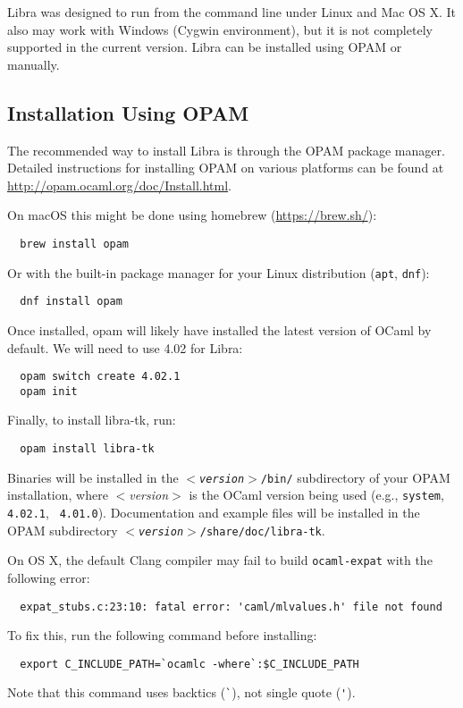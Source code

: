 \documentclass[11pt]{article}
\begin{document}
Libra was designed to run from the command line under Linux and Mac OS
X. It also may work with Windows (Cygwin environment), but it is not
completely supported in the current version.  Libra can be installed
using OPAM or manually.

\subsection{Installation Using OPAM}

The recommended way to install Libra is through the OPAM package
manager.  Detailed instructions for installing OPAM on various
platforms can be found at \url{http://opam.ocaml.org/doc/Install.html}.

On macOS this might be done using homebrew (\url{https://brew.sh/}):
\begin{verbatim}
  brew install opam
\end{verbatim}

Or with the built-in package manager for your Linux distribution ({\tt apt}, {\tt dnf}):
\begin{verbatim}
  dnf install opam
\end{verbatim}

Once installed, opam will likely have installed the latest version of OCaml
by default.  We will need to use 4.02 for Libra:
\begin{verbatim}
  opam switch create 4.02.1
  opam init
\end{verbatim}

Finally, to install libra-tk, run:
\begin{verbatim}
  opam install libra-tk
\end{verbatim}

Binaries will be installed in the {\tt {\em $<$version$>$}/bin/}
subdirectory of your OPAM installation, where {\em $<$version$>$} is
the OCaml version being used (e.g., {\tt system}, {\tt 4.02.1}, {\tt
4.01.0}).  Documentation and example files will be installed in the OPAM subdirectory
{\tt {\em $<$version$>$}/share/doc/libra-tk}.

On OS X, the default Clang compiler may fail to build
{\tt ocaml-expat} with the following error:
\begin{verbatim}
  expat_stubs.c:23:10: fatal error: 'caml/mlvalues.h' file not found
\end{verbatim}
To fix this, run the following command before installing:
\begin{verbatim}
  export C_INCLUDE_PATH=`ocamlc -where`:$C_INCLUDE_PATH
\end{verbatim}
Note that this command uses backtics (\verb|`|), not
single quote (\verb|'|).
\end{document}
